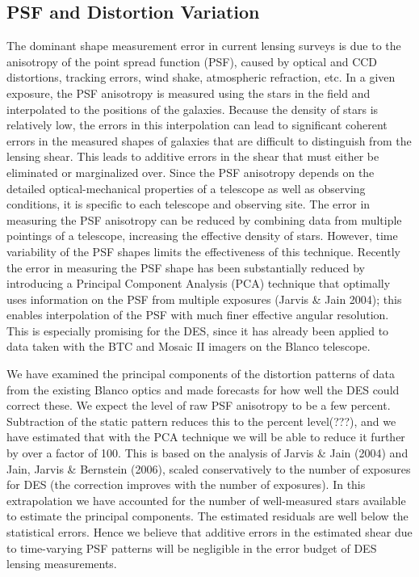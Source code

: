 \documentclass[preprint]{aastex}
\begin{document}
\subsection{PSF and Distortion Variation}
The dominant shape measurement error in current lensing surveys is
due to the anisotropy of the point spread function (PSF), caused by
optical and CCD distortions, tracking errors, wind shake,
atmospheric refraction, etc. In a given exposure, the PSF anisotropy
is measured using the stars in the field and interpolated to the
positions of the galaxies. Because the density of stars is
relatively low, the errors in this interpolation can lead to
significant coherent errors in the measured shapes of galaxies that
are difficult to distinguish from the lensing shear. This leads to
additive errors in the shear that must either be eliminated or
marginalized over. Since the PSF anisotropy depends on the detailed
optical-mechanical properties of a telescope as well as observing
conditions, it is specific to each telescope and observing site. The
error in measuring the PSF anisotropy can be reduced by combining
data from multiple pointings of a telescope, increasing the
effective density of stars. However, time variability of the PSF
shapes limits the effectiveness of this technique. Recently the
error in measuring the PSF shape has been substantially reduced by
introducing a Principal Component Analysis (PCA) technique that
optimally uses information on the PSF from multiple exposures
(Jarvis \& Jain 2004); this enables interpolation of the PSF with
much finer effective angular resolution. This is especially
promising for the DES, since it has already been applied to data
taken with the BTC and Mosaic II imagers on the Blanco telescope.

We have examined the principal components of the distortion patterns
of data from the existing Blanco optics and made forecasts for how
well the DES could correct these. 
We expect the level of raw PSF anisotropy to be a few
percent. Subtraction of the static pattern reduces
this to the percent level(???), and we have estimated that with the PCA
technique we will be able to reduce it further by over a
factor of 100. This is based on the analysis of Jarvis \& Jain
(2004) and Jain, Jarvis \& Bernstein (2006), 
scaled conservatively to the number of exposures for DES
(the correction improves with the number of exposures). In this
extrapolation we have accounted for the number of well-measured
stars available to estimate the principal components. The estimated
residuals are well below the statistical errors. Hence we believe
that additive errors in the estimated shear due to time-varying PSF
patterns will be negligible in
the error budget of DES lensing measurements.
\end{document}
